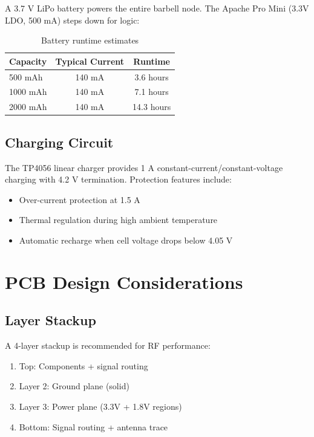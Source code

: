 A 3.7 V LiPo battery powers the entire barbell node. The Apache Pro Mini (3.3V LDO, 500 mA) steps down for logic:

\begin{table}[h]
    \centering
    \caption{Battery runtime estimates}
    \label{tab:battery_runtime}
    \begin{tabular}{lcc}
        \toprule
        \textbf{Capacity} & \textbf{Typical Current} & \textbf{Runtime} \\
        \midrule
        500 mAh & 140 mA & 3.6 hours \\
        1000 mAh & 140 mA & 7.1 hours \\
        2000 mAh & 140 mA & 14.3 hours \\
        \bottomrule
    \end{tabular}
\end{table}

\subsection{Charging Circuit}

The TP4056 linear charger provides 1 A constant-current/constant-voltage charging with 4.2 V termination. Protection features include:
\begin{itemize}
    \item Over-current protection at 1.5 A
    \item Thermal regulation during high ambient temperature
    \item Automatic recharge when cell voltage drops below 4.05 V
\end{itemize}

\section{PCB Design Considerations}

\subsection{Layer Stackup}

A 4-layer stackup is recommended for RF performance:

\begin{enumerate}
    \item Top: Components + signal routing
    \item Layer 2: Ground plane (solid)
    \item Layer 3: Power plane (3.3V + 1.8V regions)
    \item Bottom: Signal routing + antenna trace
\end{enumerate}

